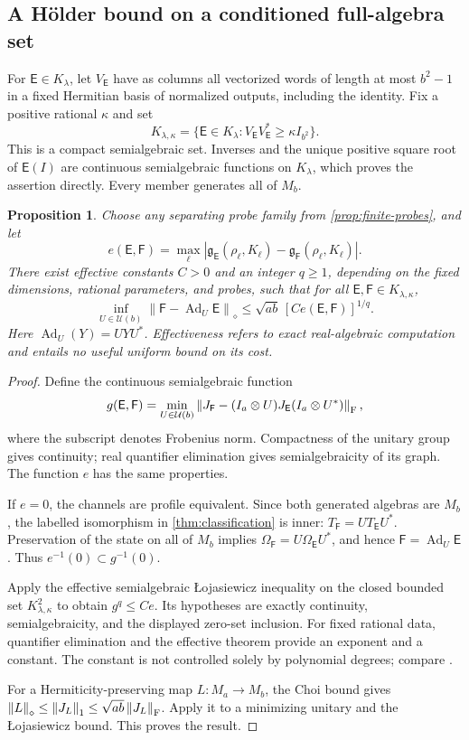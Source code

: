 \documentclass[11pt,reqno]{amsart}
\newtheorem{proposition}[theorem]{Proposition}
\theoremstyle{definition}
\theoremstyle{remark}
\numberwithin{equation}{section}
\newcommand{\E}{\mathsf E}
\newcommand{\F}{\mathsf F}
\newcommand{\norm}[1]{\left\lVert#1\right\rVert}
\newcommand{\abs}[1]{\left\lvert#1\right\rvert}
\newcommand{\rld}{\mathfrak g}
\begin{document}
\subsection{A H\"older bound on a conditioned full-algebra set}

For $\E\in K_\lambda$, let $V_\E$ have as columns all vectorized words of length at most $b^2-1$ in a fixed Hermitian basis of normalized outputs, including the identity. Fix a positive rational $\kappa$ and set
\[
 K_{\lambda,\kappa}=\{\E\in K_\lambda:V_\E V_\E^*\ge\kappa I_{b^2}\}.
\]
This is a compact semialgebraic set. Inverses and the unique positive square root of $\E(I)$ are continuous semialgebraic functions on $K_\lambda$, which proves the assertion directly. Every member generates all of $M_b$.

\begin{proposition}\label{prop:holder}
Choose any separating probe family from \cref{prop:finite-probes}, and let
\[
 e(\E,\F)=\max_\ell\abs{\rld_\E(\rho_\ell,K_\ell)-\rld_\F(\rho_\ell,K_\ell)}.
\]
There exist effective constants $C>0$ and an integer $q\ge1$, depending on the fixed dimensions, rational parameters, and probes, such that for all $\E,\F\in K_{\lambda,\kappa}$,
\[
 \inf_{U\in\mathcal U(b)}\norm{\F-\operatorname{Ad}_U\E}_\diamond
 \le\sqrt{ab}\,[C e(\E,\F)]^{1/q}.
\]
Here $\operatorname{Ad}_U(Y)=UYU^*$. Effectiveness refers to exact real-algebraic computation and entails no useful uniform bound on its cost.
\end{proposition}

\begin{proof}
Define the continuous semialgebraic function
\[
 g(\E,\F)=\min_{U\in\mathcal U(b)}
 \norm{J_\F-(I_a\otimes U)J_\E(I_a\otimes U^*)}_{\rm F},
\]
where the subscript denotes Frobenius norm. Compactness of the unitary group gives continuity; real quantifier elimination gives semialgebraicity of its graph. The function $e$ has the same properties.

If $e=0$, the channels are profile equivalent. Since both generated algebras are $M_b$, the labelled isomorphism in \cref{thm:classification} is inner: $T_\F=UT_\E U^*$. Preservation of the state on all of $M_b$ implies $\Omega_\F=U\Omega_\E U^*$, and hence $\F=\operatorname{Ad}_U\E$. Thus $e^{-1}(0)\subset g^{-1}(0)$.

Apply the effective semialgebraic \L ojasiewicz inequality \cite[Theorem~2.2]{BasuMN} on the closed bounded set $K_{\lambda,\kappa}^2$ to obtain $g^q\le Ce$. Its hypotheses are exactly continuity, semialgebraicity, and the displayed zero-set inclusion. For fixed rational data, quantifier elimination and the effective theorem provide an exponent and a constant. The constant is not controlled solely by polynomial degrees; compare \cite[Remark~2.7]{BasuMN}.

For a Hermiticity-preserving map $L:M_a\to M_b$, the Choi bound gives $\norm L_\diamond\le\norm{J_L}_1\le\sqrt{ab}\norm{J_L}_{\rm F}$. Apply it to a minimizing unitary and the \L ojasiewicz bound. This proves the result.
\end{proof}
\end{document}
